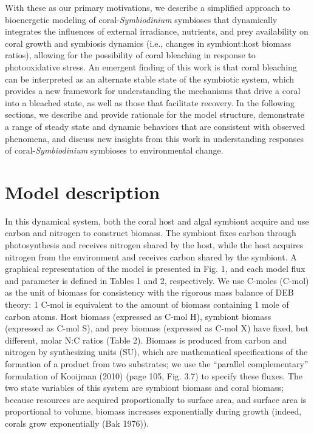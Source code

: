 \documentclass[]{elsarticle} %
\begin{document}
With these as our primary motivations, we describe a simplified approach
to bioenergetic modeling of coral-\emph{Symbiodinium} symbioses that
dynamically integrates the influences of external irradiance, nutrients,
and prey availability on coral growth and symbiosis dynamics (i.e.,
changes in symbiont:host biomass ratios), allowing for the possibility
of coral bleaching in response to photooxidative stress. An emergent
finding of this work is that coral bleaching can be interpreted as an
alternate stable state of the symbiotic system, which provides a new
framework for understanding the mechanisms that drive a coral into a
bleached state, as well as those that facilitate recovery. In the
following sections, we describe and provide rationale for the model
structure, demonstrate a range of steady state and dynamic behaviors
that are consistent with observed phenomena, and discuss new insights
from this work in understanding responses of coral-\emph{Symbiodinium}
symbioses to environmental change.

\section{Model description}\label{model-description}

In this dynamical system, both the coral host and algal symbiont acquire
and use carbon and nitrogen to construct biomass. The symbiont fixes
carbon through photosynthesis and receives nitrogen shared by the host,
while the host acquires nitrogen from the environment and receives
carbon shared by the symbiont. A graphical representation of the model
is presented in Fig. 1, and each model flux and parameter is defined in
Tables 1 and 2, respectively. We use C-moles (C-mol) as the unit of
biomass for consistency with the rigorous mass balance of DEB theory: 1
C-mol is equivalent to the amount of biomass containing 1 mole of carbon
atoms. Host biomass (expressed as C-mol H), symbiont biomass (expressed
as C-mol S), and prey biomass (expressed as C-mol X) have fixed, but
different, molar N:C ratios (Table 2). Biomass is produced from carbon
and nitrogen by synthesizing units (SU), which are mathematical
specifications of the formation of a product from two substrates; we use
the ``parallel complementary'' formulation of Kooijman (2010) (page 105,
Fig. 3.7) to specify these fluxes. The two state variables of this
system are symbiont biomass and coral biomass; because resources are
acquired proportionally to surface area, and surface area is
proportional to volume, biomass increases exponentially during growth
(indeed, corals grow exponentially (Bak 1976)).
\end{document}
